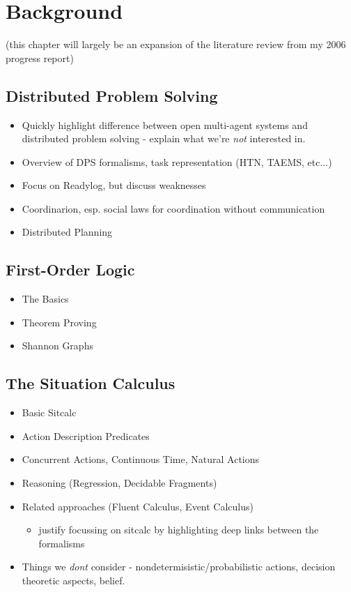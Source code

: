 \chapter{Background}\label{ch:lit-review}
\minitoc
\onehalfspace   %

(this chapter will largely be an expansion of the literature review from my 2006 progress report)

\section{Distributed Problem Solving}

\begin{itemize}
\item Quickly highlight difference between open multi-agent systems and
distributed problem solving - explain what we're \emph{not} interested in.
\item Overview of DPS formalisms, task representation (HTN, TAEMS, etc...)
\item Focus on Readylog, but discuss weaknesses
\item Coordinarion, esp. social laws for coordination without communication
\item Distributed Planning
\end{itemize}

\section{First-Order Logic}

\begin{itemize}
\item The Basics
\item Theorem Proving
\item Shannon Graphs
\end{itemize}

\section{The Situation Calculus}

\begin{itemize}
\item Basic Sitcalc
\item Action Description Predicates
\item Concurrent Actions, Continuous Time, Natural Actions
\item Reasoning (Regression, Decidable Fragments)
\item Related approaches (Fluent Calculus, Event Calculus)
  \begin{itemize}
  \item justify focussing on sitcalc by highlighting deep links between the formalisms
  \end{itemize}
\item Things we \emph{dont} consider - nondetermisistic/probabilistic actions, decision theoretic aspects, belief.
\end{itemize}

